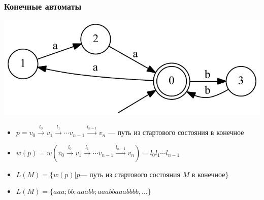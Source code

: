 \documentclass[xcolor=table,aspectratio=169]{beamer}
\begin{document}
\begin{frame}[fragile]
  \transwipe[direction=90]
  \frametitle{Конечные автоматы}
\begin{center}
        \includegraphics[height=0.4\textheight]{pictures/atm.pdf} 
\end{center}
  \begin{itemize}
  \item $p = v_0 \xrightarrow{l_0} v_1 \xrightarrow{l_1} \cdots v_{n-1}\xrightarrow{l_{n-1}}v_n$ --- путь из стартового состояния в конечное
  \item $w(p) = w(v_0 \xrightarrow{l_0} v_1 \xrightarrow{l_1} \cdots v_{n-1}\xrightarrow{l_{n-1}}v_n) = l_0 l_1 \cdots l_{n-1}$
  \item $L(M) = \{w(p) | p  \text{--- путь из стартового состояния $M$ в конечное}\}$
  \item $L(M) = \{aaa; bb; aaabb; aaabbaaabbbb, \dots\}$
  \end{itemize}

\end{frame}
\end{document}
